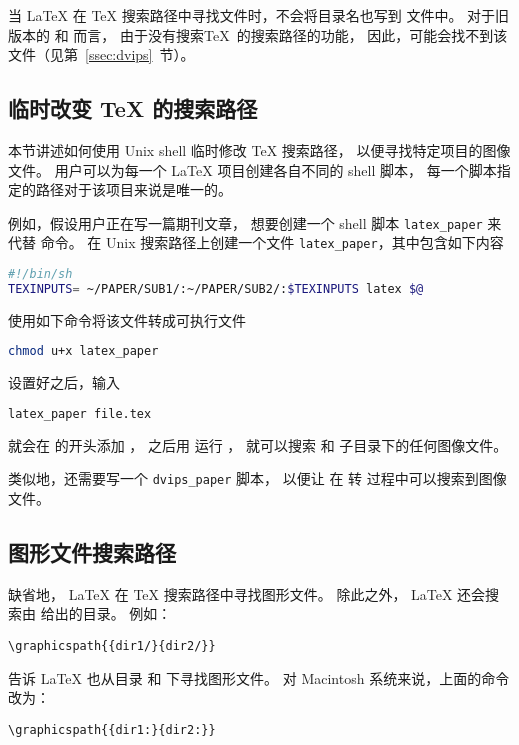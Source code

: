 当 \LaTeX{} 在 \TeX{} 搜索路径中寻找文件时，不会将目录名也写到  文件中。
对于旧版本的  和  而言，
由于没有搜索\TeX{}~的搜索路径的功能，
因此，可能会找不到该文件（见第~\ref{ssec:dvips}~节）。


\subsection{临时改变 \TeX{} 的搜索路径}\label{ssec:temptexpath}

本节讲述如何使用 Unix shell 临时修改 \TeX{} 搜索路径，
以便寻找特定项目的图像文件。
用户可以为每一个 \LaTeX{} 项目创建各自不同的 shell 脚本，
每一个脚本指定的路径对于该项目来说是唯一的。

例如，假设用户正在写一篇期刊文章，
想要创建一个 shell 脚本 \verb|latex_paper| 来代替  命令。
在 Unix 搜索路径上创建一个文件 \verb|latex_paper|，其中包含如下内容
\begin{lstlisting}[language=sh]
#!/bin/sh
TEXINPUTS= ~/PAPER/SUB1/:~/PAPER/SUB2/:$TEXINPUTS latex $@
\end{lstlisting}
使用如下命令将该文件转成可执行文件
\begin{lstlisting}[language=sh]
chmod u+x latex_paper
\end{lstlisting}

设置好之后，输入
\begin{lstlisting}[language=sh]
latex_paper file.tex
\end{lstlisting}
就会在  的开头添加 ，
之后用  运行 ，
就可以搜索  和  子目录下的任何图像文件。

类似地，还需要写一个 \verb|dvips_paper| 脚本，
以便让  在  转  过程中可以搜索到图像文件。

\subsection{图形文件搜索路径}\label{ssec:graphpath}
缺省地， \LaTeX{} 在 \TeX{} 搜索路径中寻找图形文件。
除此之外， \LaTeX{} 还会搜索由  给出的目录。
例如：
\begin{lstlisting}
\graphicspath{{dir1/}{dir2/}}
\end{lstlisting}
告诉 \LaTeX{} 也从目录  和  下寻找图形文件。
对 Macintosh 系统来说，上面的命令改为：
\begin{lstlisting}
\graphicspath{{dir1:}{dir2:}}
\end{lstlisting}

